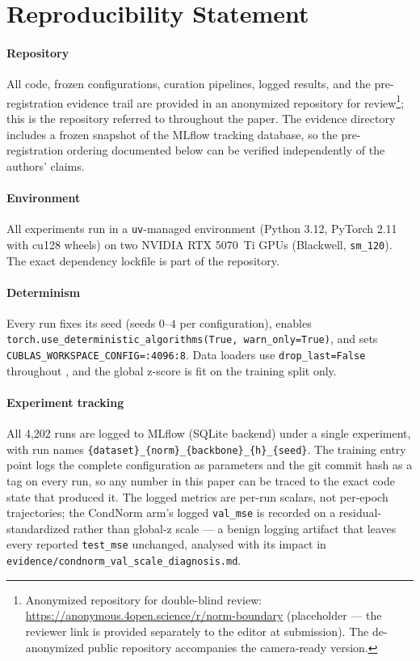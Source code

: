 \section{Reproducibility Statement}\label{app:repro}

\paragraph{Repository}
All code, frozen configurations, curation pipelines, logged results, and the
pre-registration evidence trail are provided in an anonymized repository for
review\footnote{Anonymized repository for double-blind review:
\url{https://anonymous.4open.science/r/norm-boundary} (placeholder --- the
reviewer link is provided separately to the editor at submission). The
de-anonymized public repository accompanies the camera-ready version.}; this is
the repository referred to throughout the paper. The evidence directory
includes a frozen snapshot of the MLflow tracking database, so the
pre-registration ordering documented below can be verified independently of the
authors' claims.

\paragraph{Environment}
All experiments run in a \texttt{uv}-managed environment (Python 3.12,
PyTorch 2.11 with cu128 wheels) on two NVIDIA RTX 5070~Ti GPUs (Blackwell,
\texttt{sm\_120}). The exact dependency lockfile is part of the repository.

\paragraph{Determinism}
Every run fixes its seed (seeds $0$--$4$ per configuration), enables
\texttt{torch.use\_deterministic\_algorithms(True, warn\_only=True)}, and sets
\texttt{CUBLAS\_WORKSPACE\_CONFIG=:4096:8}. Data loaders use
\texttt{drop\_last=False} throughout \citep{qiu2024tfb}, and the global
z-score is fit on the training split only.

\paragraph{Experiment tracking}
All 4{,}202 runs are logged to MLflow (SQLite backend) under a single
experiment, with run names\linebreak
\texttt{\{dataset\}\_\{norm\}\_\{backbone\}\_\{h\}\_\{seed\}}. The training
entry point logs the complete configuration as parameters and the git commit
hash as a tag on every run, so any number in this paper can be traced to the
exact code state that produced it. The logged metrics are per-run scalars, not
per-epoch trajectories; the CondNorm arm's logged \texttt{val\_mse} is recorded
on a residual-standardized rather than global-z scale --- a benign logging
artifact that leaves every reported \texttt{test\_mse} unchanged, analysed with
its impact in \texttt{evidence/condnorm\_val\_scale\_diagnosis.md}.


